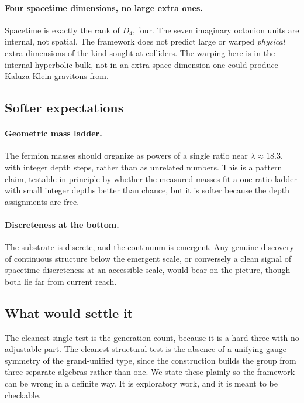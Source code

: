 \paragraph{Four spacetime dimensions, no large extra ones.} Spacetime is exactly the rank of $D_4$, four. The seven
imaginary octonion units are internal, not spatial. The framework does not predict large or warped \emph{physical}
extra dimensions of the kind sought at colliders. The warping here is in the internal hyperbolic bulk, not in an extra
space dimension one could produce Kaluza-Klein gravitons from.

\subsection{Softer expectations}

\paragraph{Geometric mass ladder.} The fermion masses should organize as powers of a single ratio near
$\lambda \approx 18.3$, with integer depth steps, rather than as unrelated numbers. This is a pattern claim, testable in
principle by whether the measured masses fit a one-ratio ladder with small integer depths better than chance, but it is
softer because the depth assignments are free.

\paragraph{Discreteness at the bottom.} The substrate is discrete, and the continuum is emergent. Any genuine discovery
of continuous structure below the emergent scale, or conversely a clean signal of spacetime discreteness at an
accessible scale, would bear on the picture, though both lie far from current reach.

\subsection{What would settle it}

The cleanest single test is the generation count, because it is a hard three with no adjustable part. The cleanest
structural test is the absence of a unifying gauge symmetry of the grand-unified type, since the construction builds the
group from three separate algebras rather than one. We state these plainly so the framework can be wrong in a definite
way. It is exploratory work, and it is meant to be checkable.
